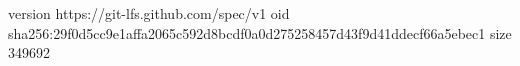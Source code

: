 version https://git-lfs.github.com/spec/v1
oid sha256:29f0d5cc9e1affa2065c592d8bcdf0a0d275258457d43f9d41ddecf66a5ebec1
size 349692
